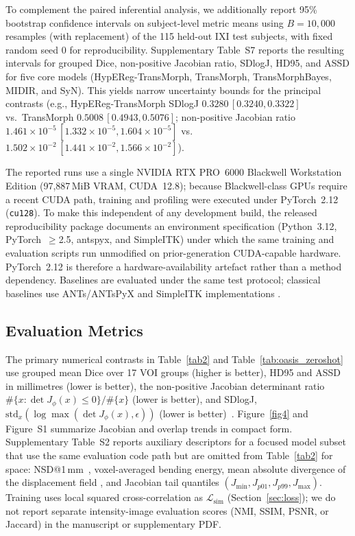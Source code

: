 \documentclass[jimaging,article,submit,pdftex,moreauthors]{Definitions/mdpi}
\begin{document}
To complement the paired inferential analysis, we additionally report 95\% bootstrap confidence intervals on subject-level metric means using \(B=10{,}000\) resamples (with replacement) of the 115 held-out IXI test subjects, with fixed random seed 0 for reproducibility. Supplementary Table~S7 reports the resulting intervals for grouped Dice, non-positive Jacobian ratio, SDlogJ, HD95, and ASSD for five core models (HypEReg-TransMorph, TransMorph, TransMorphBayes, MIDIR, and SyN). This yields narrow uncertainty bounds for the principal contrasts (e.g., HypEReg-TransMorph SDlogJ \(0.3280\,[0.3240,0.3322]\) vs.\ TransMorph \(0.5008\,[0.4943,0.5076]\); non-positive Jacobian ratio \(1.461\times10^{-5}\,[1.332\times10^{-5},1.604\times10^{-5}]\) vs.\ \(1.502\times10^{-2}\,[1.441\times10^{-2},1.566\times10^{-2}]\)).

The reported runs use a single NVIDIA RTX PRO~6000 Blackwell Workstation Edition (97{,}887\,MiB VRAM, CUDA~12.8); because Blackwell-class GPUs require a recent CUDA path, training and profiling were executed under PyTorch~2.12 (\texttt{cu128}). To make this independent of any development build, the released reproducibility package documents an environment specification (Python~3.12, PyTorch~\(\geq\)2.5, antspyx, and SimpleITK) under which the same training and evaluation scripts run unmodified on prior-generation CUDA-capable hardware. PyTorch~2.12 is therefore a hardware-availability artefact rather than a method dependency. Baselines are evaluated under the same test protocol; classical baselines use ANTs/ANTsPyX and SimpleITK implementations \cite{avants2008ants,antspyx2024,simpleitk2013}.

\subsection{Evaluation Metrics}
The primary numerical contrasts in Table~\ref{tab2} and Table~\ref{tab:oasis_zeroshot} use grouped mean Dice over 17 VOI groups (higher is better), HD95 and ASSD in millimetres (lower is better), the non-positive Jacobian determinant ratio \(\#\{x:\det J_\phi(x)\le 0\}/\#\{x\}\) (lower is better), and SDlogJ, \(\mathrm{std}_x(\log\max(\det J_\phi(x),\epsilon))\) (lower is better)~\cite{hering2023learn2reg}. Figure~\ref{fig4} and Figure~S1 summarize Jacobian and overlap trends in compact form. Supplementary Table~S2 reports auxiliary descriptors for a focused model subset that use the same evaluation code path but are omitted from Table~\ref{tab2} for space: NSD@1\,mm~\cite{dice1945,heimann2009}, voxel-averaged bending energy, mean absolute divergence of the displacement field \cite{bookstein1989tps,mok2020lapirn}, and Jacobian tail quantiles \((J_{\min}, J_{p01}, J_{p99}, J_{\max})\). Training uses local squared cross-correlation as \(\mathcal{L}_{\mathrm{sim}}\) (Section~\ref{sec:loss}); we do not report separate intensity-image evaluation scores (NMI, SSIM, PSNR, or Jaccard) in the manuscript or supplementary PDF.
\end{document}
